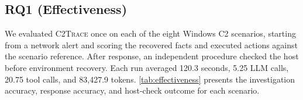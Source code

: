 \documentclass[pdflatex,sn-basic]{sn-jnl}
\newcommand{\system}{\textsc{C2Trace}\xspace}
\newcommand{\NA}{\textsc{n/a}}
\begin{document}




\subsection{RQ1 (Effectiveness)}

We evaluated \system once on each of the eight Windows C2 scenarios, starting from a network alert and scoring the recovered facts and executed actions against the scenario reference. After response, an independent procedure checked the host before environment recovery. Each run averaged 120.3 seconds, 5.25 LLM calls, 20.75 tool calls, and 83,427.9 tokens. \autoref{tab:effectiveness} presents the investigation accuracy, response accuracy, and host-check outcome for each scenario.
\end{document}
